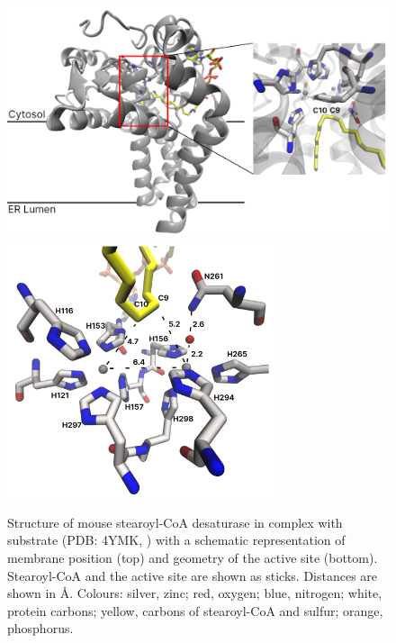 \begin{figure}[htbp]
    \centering
    \includegraphics[width=1.0\textwidth]{Figures/SCD1.png}
    \includegraphics[width=0.7\textwidth]{Figures/scd1_active_site.png}
    \caption{Structure of mouse stearoyl-CoA desaturase in complex with substrate (PDB: 4YMK, \cite{Bai2015}) with a schematic representation of membrane position (top) and geometry of the active site (bottom). Stearoyl-CoA and the active site are shown as sticks. Distances are shown in Å. Colours: silver, zinc; red, oxygen; blue, nitrogen; white, protein carbons; yellow, carbons of stearoyl-CoA and sulfur; orange, phosphorus.}
    \label{fig:SCD1_structure}
\end{figure}


